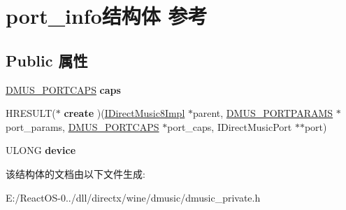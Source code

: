 \hypertarget{structport__info}{}\section{port\+\_\+info结构体 参考}
\label{structport__info}
\subsection*{Public 属性}
\begin{DoxyCompactItemize}
\item 
\mbox{\label{structport__info_a0776473874931e82a0f166b7c8681234}} 
\hyperlink{struct___d_m_u_s___p_o_r_t_c_a_p_s}{D\+M\+U\+S\+\_\+\+P\+O\+R\+T\+C\+A\+PS} {\bfseries caps}
\item 
\mbox{\label{structport__info_a52ac404fabff3e8ac0ca7217f06e7554}} 
H\+R\+E\+S\+U\+LT($\ast$ {\bfseries create} )(\hyperlink{struct_i_direct_music8_impl}{I\+Direct\+Music8\+Impl} $\ast$parent, \hyperlink{struct___d_m_u_s___p_o_r_t_p_a_r_a_m_s8}{D\+M\+U\+S\+\_\+\+P\+O\+R\+T\+P\+A\+R\+A\+MS} $\ast$port\+\_\+params, \hyperlink{struct___d_m_u_s___p_o_r_t_c_a_p_s}{D\+M\+U\+S\+\_\+\+P\+O\+R\+T\+C\+A\+PS} $\ast$port\+\_\+caps, I\+Direct\+Music\+Port $\ast$$\ast$port)
\item 
\mbox{\label{structport__info_a06a325939715ce0096d6de93a4956f60}} 
U\+L\+O\+NG {\bfseries device}
\end{DoxyCompactItemize}


该结构体的文档由以下文件生成\+:\begin{DoxyCompactItemize}
\item 
E\+:/\+React\+O\+S-\/0../dll/directx/wine/dmusic/dmusic\+\_\+private.\+h\end{DoxyCompactItemize}
